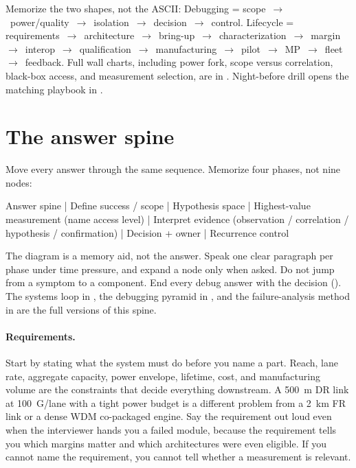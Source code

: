 Memorize the two shapes, not the ASCII: Debugging =
scope~$\rightarrow$~power/quality~$\rightarrow$~isolation~$\rightarrow$~decision~$\rightarrow$~control.
Lifecycle =
requirements~$\rightarrow$~architecture~$\rightarrow$~bring-up~$\rightarrow$~characterization~$\rightarrow$~margin~$\rightarrow$~interop~$\rightarrow$~qualification~$\rightarrow$~manufacturing~$\rightarrow$~pilot~$\rightarrow$~MP~$\rightarrow$~fleet~$\rightarrow$~feedback.
Full wall charts, including power fork, scope versus correlation, black-box
access, and measurement selection, are in . Night-before
drill opens the matching playbook in .

\section{The answer spine}

Move every answer through the same sequence. Memorize four phases, not nine
nodes:
\begin{dectree}
Answer spine
  |
Define success / scope
  |
Hypothesis space
  |
Highest-value measurement (name access level)
  |
Interpret evidence (observation / correlation / hypothesis / confirmation)
  |
Decision + owner
  |
Recurrence control
\end{dectree}
The diagram is a memory aid, not the answer. Speak one clear paragraph per
phase under time pressure, and expand a node only when asked. Do not jump from
a symptom to a component. End every debug answer with the decision
(). The systems loop in
, the debugging pyramid in
, and the failure-analysis method in
 are the full versions of this spine.

\paragraph{Requirements.}
Start by stating what the system must do before you name a part. Reach, lane
rate, aggregate capacity, power envelope, lifetime, cost, and manufacturing
volume are the constraints that decide everything downstream. A 500~m DR
link at 100~G/lane with a tight power budget is a different
problem from a 2~km FR link or a dense WDM
co-packaged engine. Say the requirement out loud even when the interviewer
hands you a failed module, because the requirement tells you which margins
matter and which architectures were even eligible. If you cannot name the
requirement, you cannot tell whether a measurement is relevant.

